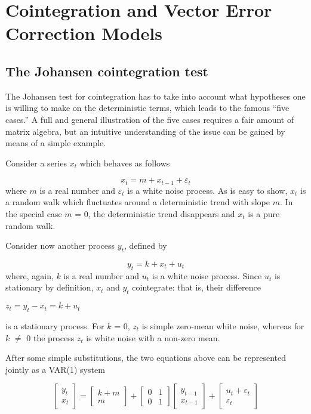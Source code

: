 \chapter{Cointegration and Vector Error
    Correction Models}
\label{vecm-explanation}



\section{The Johansen cointegration test}
\label{johansen-test}


      The Johansen test for cointegration has to take into account what
      hypotheses one is willing to make on the deterministic terms, which leads
      to the famous ``five cases.'' A full and general illustration
      of the five cases requires a fair amount of matrix algebra, but an
      intuitive understanding of the issue can be gained by means of a simple
      example. 
    
      Consider a series $x_t$ which behaves as follows
      
	  \[ x_t = m + x_{t-1} + \varepsilon_t \]
	 where $m$ is a real number and
      $\varepsilon$$\ensuremath{_{t}}$ is a white noise
      process. As is easy to show, $x_t$ is a random walk which fluctuates around
      a deterministic trend with slope $m$. In the special
      case $m$ = 0, the deterministic trend disappears and
      $x_t$ is a pure random walk.
    
      Consider now another process $y_t$, defined by 
      
	  \[ y_t = k + x_t + u_t \]
	 where, again, $k$ is a real number
      and $u_t$ is a white noise process. Since $u_t$ is stationary by definition,
      $x_t$ and $y_t$ cointegrate: that is, their difference 
      
	  $z_t = y_t - x_t = k + u_t$
	
      is a stationary process. For $k$ = 0, $z_t$ is simple zero-mean
      white noise, whereas for $k$ $\ne$ 0 the process $z_t$ is
      white noise with a non-zero mean.
  
      After some simple substitutions, the two equations above can be represented
      jointly as a VAR(1) system
      
\renewcommand{\arraystretch}{1.3}
\setlength{\arraycolsep}{.05in}
	\[ \left[  \begin{array}{c} y_t \\ x_t \end{array} \right] = \left[
	\begin{array}{c} k + m \\ m \end{array} \right] + \left[
	\begin{array}{rr} 0 & 1 \\ 0 & 1 \end{array} \right] \left[
	\begin{array}{c} y_{t-1} \\ x_{t-1} \end{array} \right] + \left[
	\begin{array}{c} u_t + \varepsilon_t \\ \varepsilon_t \end{array}
	\right] \]
	
